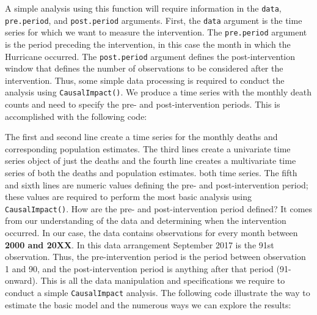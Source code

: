 \documentclass[12pt]{article}
\newenvironment{Shaded}{\begin{snugshade}}{\end{snugshade}}
\newcommand{\DecValTok}[1]{\textcolor[rgb]{0.00,0.00,0.81}{#1}}
\newcommand{\FunctionTok}[1]{\textcolor[rgb]{0.00,0.00,0.00}{#1}}
\newcommand{\NormalTok}[1]{#1}
\newcommand{\OtherTok}[1]{\textcolor[rgb]{0.56,0.35,0.01}{#1}}
\newcommand{\SpecialCharTok}[1]{\textcolor[rgb]{0.00,0.00,0.00}{#1}}
\begin{document}
A simple analysis using this function will require information in the
\texttt{data}, \texttt{pre.period}, and \texttt{post.period} arguments.
First, the \texttt{data} argument is the time series for which we want
to measure the intervention. The \texttt{pre.period} argument is the
period preceding the intervention, in this case the month in which the
Hurricane occurred. The \texttt{post.period} argument defines the
post-intervention window that defines the number of observations to be
considered after the intervention. Thus, some simple data processing is
required to conduct the analysis using \texttt{CausalImpact()}. We
produce a time series with the monthly death counts and need to specify
the pre- and post-intervention periods. This is accomplished with the
following code:

\begin{Shaded}
\end{Shaded}

The first and second line create a time series for the monthly deaths
and corresponding population estimates. The third lines create a
univariate time series object of just the deaths and the fourth line
creates a multivariate time series of both the deaths and population
estimates. both time series. The fifth and sixth lines are numeric
values defining the pre- and post-intervention period; these values are
required to perform the most basic analysis using
\texttt{CausalImpact()}. How are the pre- and post-intervention period
defined? It comes from our understanding of the data and determining
when the intervention occurred. In our case, the data contains
observations for every month between \textbf{2000 and 20XX}. In this
data arrangement September 2017 is the 91st observation. Thus, the
pre-intervention period is the period between observation 1 and 90, and
the post-intervention period is anything after that period (91-onward).
This is all the data manipulation and specifications we require to
conduct a simple \texttt{CausalImpact} analysis. The following code
illustrate the way to estimate the basic model and the numerous ways we
can explore the results:
\end{document}
